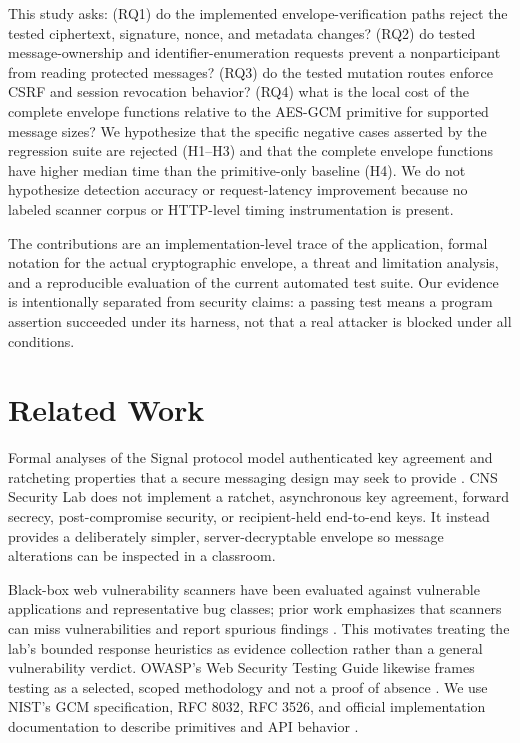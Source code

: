 \documentclass[conference]{IEEEtran}
\begin{document}
This study asks: (RQ1) do the implemented envelope-verification paths reject the tested ciphertext, signature, nonce, and metadata changes? (RQ2) do tested message-ownership and identifier-enumeration requests prevent a nonparticipant from reading protected messages? (RQ3) do the tested mutation routes enforce CSRF and session revocation behavior? (RQ4) what is the local cost of the complete envelope functions relative to the AES-GCM primitive for supported message sizes? We hypothesize that the specific negative cases asserted by the regression suite are rejected (H1--H3) and that the complete envelope functions have higher median time than the primitive-only baseline (H4). We do not hypothesize detection accuracy or request-latency improvement because no labeled scanner corpus or HTTP-level timing instrumentation is present.

The contributions are an implementation-level trace of the application, formal notation for the actual cryptographic envelope, a threat and limitation analysis, and a reproducible evaluation of the current automated test suite. Our evidence is intentionally separated from security claims: a passing test means a program assertion succeeded under its harness, not that a real attacker is blocked under all conditions.

\section{Related Work}
Formal analyses of the Signal protocol model authenticated key agreement and ratcheting properties that a secure messaging design may seek to provide \cite{cohn2017signal}. CNS Security Lab does not implement a ratchet, asynchronous key agreement, forward secrecy, post-compromise security, or recipient-held end-to-end keys. It instead provides a deliberately simpler, server-decryptable envelope so message alterations can be inspected in a classroom.

Black-box web vulnerability scanners have been evaluated against vulnerable applications and representative bug classes; prior work emphasizes that scanners can miss vulnerabilities and report spurious findings \cite{doupe2010}. This motivates treating the lab's bounded response heuristics as evidence collection rather than a general vulnerability verdict. OWASP's Web Security Testing Guide likewise frames testing as a selected, scoped methodology and not a proof of absence \cite{owaspwstg}. We use NIST's GCM specification, RFC 8032, RFC 3526, and official implementation documentation to describe primitives and API behavior \cite{nistgcm,rfc8032,rfc3526,pyca}.
\end{document}
